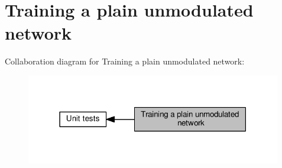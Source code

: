 \hypertarget{group__testtrainbasic}{}\section{Training a plain unmodulated network}
\label{group__testtrainbasic}
Collaboration diagram for Training a plain unmodulated network\+:
\nopagebreak
\begin{figure}[H]
\begin{center}
\leavevmode
\includegraphics[width=316pt]{group__testtrainbasic}
\end{center}
\end{figure}
